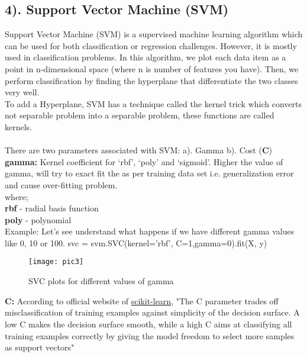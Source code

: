 \documentclass[Proceedings]{ascelike}
\begin{document}
\subsection{4). Support Vector Machine (SVM)}
Support Vector Machine (SVM) is a supervised machine learning algorithm which can be used for both classification or regression challenges. However, it is mostly used in classification problems. In this algorithm, we plot each data item as a point in n-dimensional space (where n is number of features you have). %
Then, we perform classification by finding the hyperplane that differentiate the two classes very well.\\
To add a Hyperplane, SVM has a technique called the kernel trick which converts not separable problem into a separable problem, these functions are called kernels.\\
\\There are two parameters associated with SVM:
\subitem a). Gamma 
\subitem b). Cost (\textbf{C})\\
\textbf{gamma:} Kernel coefficient for ‘rbf’, ‘poly’ and ‘sigmoid’. Higher the value of gamma, will try to exact fit the as per training data set i.e. generalization error and cause over-fitting problem.\\
where;\\
\textbf{rbf} - radial basis function \\
\textbf{poly} - polynomial \\

Example: Let’s see understand what happens if we have different gamma values like 0, 10 or 100.
svc = svm.SVC(kernel='rbf', C=1,gamma=0).fit(X, y)
\begin{figure}[!ht]
	\centering
	\texttt{[image: pic3]}
	\caption{SVC plots for different values of gamma}
	\label{fig:pic3}
\end{figure}


\textbf{C:} According to official website of \href{http://scikit-learn.org/stable/auto_examples/svm/plot_rbf_parameters.html}{scikit-learn}, "The C parameter trades off misclassification of training examples against simplicity of the decision surface. A low C makes the decision surface smooth, while a high C aims at classifying all training examples correctly by giving the model freedom to select more samples as support vectors"
\end{document}

